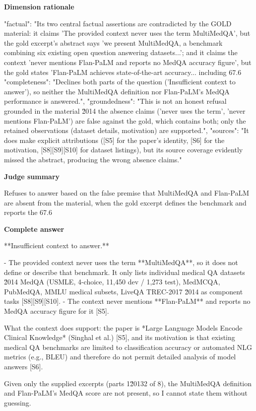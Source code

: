 \documentclass[10pt]{article}
\begin{document}
\textbf{Dimension rationale}
\begin{EvidenceText}
{
  "factual": "Its two central factual assertions are contradicted by the GOLD material: it claims 'The provided context never uses the term MultiMedQA', but the gold excerpt's abstract says 'we present MultiMedQA, a benchmark combining six existing open question answering datasets...'; and it claims the context 'never mentions Flan-PaLM and reports no MedQA accuracy figure', but the gold states 'Flan-PaLM achieves state-of-the-art accuracy... including 67.6%
  "completeness": "Declines both parts of the question ('Insufficient context to answer'), so neither the MultiMedQA definition nor Flan-PaLM's MedQA performance is answered.",
  "groundedness": "This is not an honest refusal grounded in the material \u2014 the absence claims ('never uses the term', 'never mentions Flan-PaLM') are false against the gold, which contains both; only the retained observations (dataset details, motivation) are supported.",
  "sources": "It does make explicit attributions ([S5] for the paper's identity, [S6] for the motivation, [S8][S9][S10] for dataset listings), but its source coverage evidently missed the abstract, producing the wrong absence claims."
}
\end{EvidenceText}

\textbf{Judge summary}
\begin{EvidenceText}
Refuses to answer based on the false premise that MultiMedQA and Flan-PaLM are absent from the material, when the gold excerpt defines the benchmark and reports the 67.6%
\end{EvidenceText}

\textbf{Complete answer}
\begin{AnswerText}
**Insufficient context to answer.**

- The provided context never uses the term **MultiMedQA**, so it does not define or describe that benchmark. It only lists individual medical QA datasets \u2014 MedQA (USMLE, 4-choice, 11,450 dev / 1,273 test), MedMCQA, PubMedQA, MMLU medical subsets, LiveQA TREC-2017 \u2014 as component tasks [S8][S9][S10].
- The context never mentions **Flan-PaLM** and reports no MedQA accuracy figure for it [S5].

What the context does support: the paper is *Large Language Models Encode Clinical Knowledge* (Singhal et al.) [S5], and its motivation is that existing medical QA benchmarks are limited to classification accuracy or automated NLG metrics (e.g., BLEU) and therefore do not permit detailed analysis of model answers [S6].

Given only the supplied excerpts (parts 1\u20132 of 8), the MultiMedQA definition and Flan-PaLM's MedQA score are not present, so I cannot state them without guessing.
\end{AnswerText}
\end{document}
